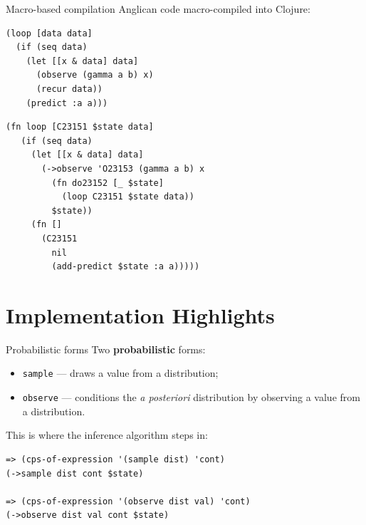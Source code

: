 \documentclass{beamer}
\begin{document}
\begin{frame}[fragile]{Macro-based compilation}
    Anglican code macro-compiled into Clojure:
    \begin{minipage}{0.48\textwidth}
\begin{verbatim}
(loop [data data]
  (if (seq data)
    (let [[x & data] data]
      (observe (gamma a b) x)
      (recur data))
    (predict :a a)))
\end{verbatim}
    \end{minipage}
    \begin{minipage}{0.44\textwidth}
    \vspace{2em}
\begin{verbatim}
(fn loop [C23151 $state data]
   (if (seq data)
     (let [[x & data] data]
       (->observe 'O23153 (gamma a b) x
         (fn do23152 [_ $state]
           (loop C23151 $state data))
         $state))
     (fn []
       (C23151
         nil
         (add-predict $state :a a)))))
\end{verbatim}
    \end{minipage}
\end{frame}

\section{Implementation Highlights}

\begin{frame}[fragile]{Probabilistic forms}
    Two \textbf{probabilistic} forms:
    \begin{itemize}
        \item \texttt{sample} --- draws a value from a
            distribution;
        \item \texttt{observe} --- conditions the \textit{a
            posteriori} distribution by observing a value from a
            distribution.
    \end{itemize}
    \bigskip
    This is where the inference algorithm steps in:
\begin{verbatim}
=> (cps-of-expression '(sample dist) 'cont)
(->sample dist cont $state)

=> (cps-of-expression '(observe dist val) 'cont)
(->observe dist val cont $state)
\end{verbatim}
\end{frame}
\end{document}
